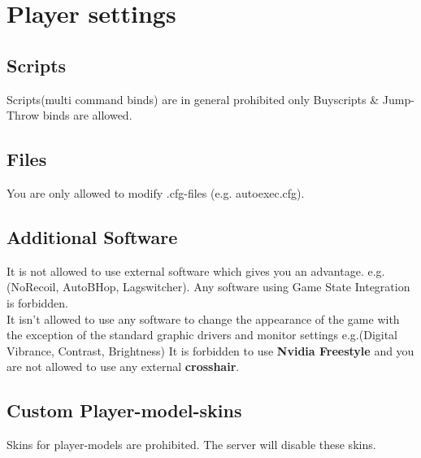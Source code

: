 \documentclass{article}
\begin{document}
\section{Player settings}

\subsection{Scripts}
Scripts(multi command binds) are in general prohibited only Buyscripts & Jump-Throw binds are allowed.

\subsection{Files}
You are only allowed to modify .cfg-files (e.g. autoexec.cfg).\\

\subsection{Additional Software}
It is not allowed to use external software which gives you an advantage. e.g.(NoRecoil, AutoBHop, Lagswitcher). Any software using Game State Integration is forbidden.\\
It isn't allowed to use any software to change the appearance of the game with the exception of the standard graphic drivers and monitor settings e.g.(Digital Vibrance, Contrast, Brightness)
It is forbidden to use \textbf{Nvidia Freestyle} and you are not allowed to use any external \textbf{crosshair}.


\subsection{Custom Player-model-skins}
Skins for player-models are prohibited. The server will disable these skins.


\pagebreak
\end{document}
